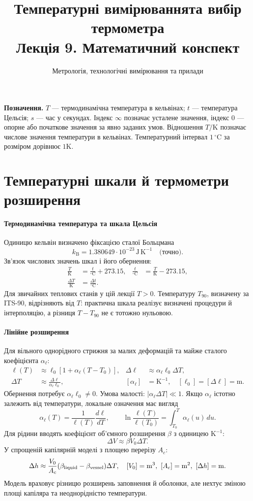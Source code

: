 \documentclass[11pt,a4paper]{article}
\title{Температурні вимірювання\newline та вибір термометра\\[6pt]\large Лекція 9. Математичний конспект}
\author{Метрологія, технологічні вимірювання та прилади}
\date{}
\newcommand{\K}{\mathrm{K}}
\newcommand{\C}{\,{}^{\circ}\mathrm{C}}
\newcommand{\unit}[1]{\,\mathrm{#1}}
\newcommand{\defn}[1]{\paragraph{#1}}
\begin{document}
\raggedright
\maketitle
\vspace{-4mm}
\textbf{Позначення.} $T$ --- термодинамічна температура в кельвінах;
$t$ --- температура Цельсія; $s$ --- час у секундах.
Індекс $\infty$ позначає усталене значення, індекс $0$ --- опорне або початкове значення за явно заданих умов.
Відношення $T/\K$ позначає числове значення температури в кельвінах.
Температурний інтервал $1\C$ за розміром дорівнює $1\K$.

\section{Температурні шкали й термометри розширення}

\defn{Термодинамічна температура та шкала Цельсія}
Одиницю кельвін визначено фіксацією сталої Больцмана
\[
 k_{\mathrm B}=1.380649\cdot10^{-23}\unit{J\,K^{-1}}
 \quad\text{(точно)}.
\]
Зв'язок числових значень шкал і його обернення:
\begin{align}
 \frac{T}{\K}&=\frac{t}{{}^{\circ}\mathrm C}+273.15, &
 \frac{t}{{}^{\circ}\mathrm C}&=\frac{T}{\K}-273.15,\\
 \frac{\Delta T}{\K}&=\frac{\Delta t}{{}^{\circ}\mathrm C}.
\end{align}
Для звичайних теплових станів у цій лекції $T>0$. Температуру $T_{90}$, визначену за ITS-90, відрізняють від $T$: практична шкала реалізує визначені процедури й інтерполяцію, а різниця $T-T_{90}$ не є тотожно нульовою.

\defn{Лінійне розширення}
Для вільного однорідного стрижня за малих деформацій та майже сталого коефіцієнта $\alpha_\ell$:
\begin{align}
 \ell(T)&\approx\ell_0[1+\alpha_\ell(T-T_0)], &
 \Delta\ell&\approx\alpha_\ell\ell_0\Delta T,\\
 \Delta T&\approx\frac{\Delta\ell}{\alpha_\ell\ell_0}, &
 [\alpha_\ell]&=\K^{-1},\quad [\ell_0]=[\Delta\ell]=\mathrm m.
\end{align}
Обернення потребує $\alpha_\ell\ell_0\ne0$.
Умова малості: $|\alpha_\ell\Delta T|\ll1$.
Якщо $\alpha_\ell$ істотно залежить від температури, локальне означення має вигляд
\[
 \alpha_\ell(T)=\frac{1}{\ell(T)}\frac{d\ell}{dT},\qquad
 \ln\frac{\ell(T)}{\ell(T_0)}=\int_{T_0}^{T}\alpha_\ell(u)\,du.
\]
Для рідини вводять коефіцієнт об'ємного розширення $\beta$ з одиницею $\K^{-1}$:
\[
 \Delta V\approx\beta V_0\Delta T.
\]
У спрощеній капілярній моделі з площею перерізу $A_c$:
\[
 \Delta h\approx\frac{V_0}{A_c}(\beta_{\rm liquid}-\beta_{\rm vessel})\Delta T,
 \quad [V_0]=\mathrm{m^3},\ [A_c]=\mathrm{m^2},\ [\Delta h]=\mathrm m.
\]
Модель враховує різницю розширень заповнення й оболонки, але нехтує зміною площі капіляра та неоднорідністю температури.
\end{document}
